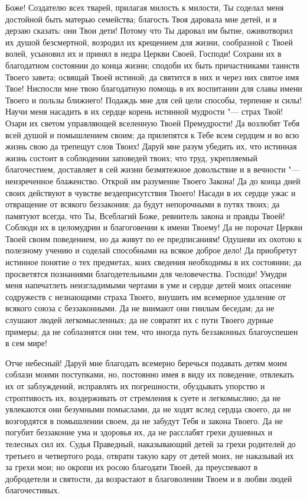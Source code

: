 Боже! Создателю всех тварей, прилагая милость к милости, Ты соделал меня достойной быть матерью семейства; благость Твоя даровала мне детей, и я дерзаю сказать: они Твои дети! Потому что Ты даровал им бытие, оживотворил их душой безсмертной, возродил их крещением для жизни, сообразной с Твоей волей, усыновил их и принял в недра Церкви Своей, Господи! Сохрани их в благодатном состоянии до конца жизни; сподоби их быть причастниками таинств Твоего завета; освящай Твоей истиной; да святится в них и через них святое имя Твое! Ниспосли мне твою благодатную помощь в их воспитании для славы имени Твоего и пользы ближнего! Подаждь мне для сей цели способы, терпение и силы! Научи меня насадить в их сердце корень истинной мудрости "--- страх Твой! Озари их светом управляющей вселенную Твоей Премудрости! Да возлюбят Тебя всей душой и помышлением своим; да прилепятся к Тебе всем сердцем и во всю жизнь свою да трепещут слов Твоих! Даруй мне разум убедить их, что истинная жизнь состоит в соблюдении заповедей твоих; что труд, укрепляемый благочестием, доставляет в сей жизни безмятежное довольствие и в вечности "--- неизреченное блаженство. Открой им разумение Твоего Закона! Да до конца дней своих действуют в чувстве вездеприсутствия Твоего! Насади в их сердце ужас и отвращение от всякого беззакония; да будут непорочными в путях твоих; да памятуют всегда, что Ты, Всеблагий Боже, ревнитель закона и правды Твоей! Соблюди их в целомудрии и благоговении к имени Твоему! Да не порочат Церкви Твоей своим поведением, но да живут по ее предписаниям! Одушеви их охотою к полезному учению и соделай способными на всякое доброе дело! Да приобретут истинное понятие о тех предметах, коих сведения необходимы в их состоянии; да просветятся познаниями благодетельными для человечества. Господи! Умудри меня напечатлеть неизгладимыми чертами в уме и сердце детей моих опасение содружеств с незнающими страха Твоего, внушить им всемерное удаление от всякого союза с беззаконными. Да не внимают они гнилым беседам; да не слушают людей легкомысленных; да не совратят их с пути Твоего дурные примеры; да не соблазнятся они тем, что иногда путь беззаконных благоуспешен в сем мире!

\shortpage[3]{}

Отче небесный! Даруй мне благодать всемерно беречься подавать детям моим соблазн моими поступками, но, постоянно имея в виду их поведение, отвлекать их от заблуждений, исправлять их погрешности, обуздывать упорство и строптивость их, воздерживать от стремления к суете и легкомыслию; да не увлекаются они безумными помыслами, да не ходят вслед сердца своего, да не возгордятся в помышлении своем, да не забудут Тебя и закона Твоего. Да не погубит беззаконие ума и здоровья их, да не расслабят грехи душевных и телесных сил их. Судья Праведный, наказывающий детей за грехи родителей до третьего и четвертого рода, отврати такую кару от детей моих, не наказывай их за грехи мои; но окропи их росою благодати Твоей, да преуспевают в добродетели и святости, да возрастают в благоволении Твоем и в любви людей благочестивых.


